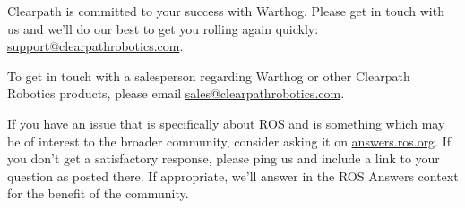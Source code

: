 \documentclass[]{clearpath-latex/clearpath-manual}
\begin{document}
Clearpath is committed to your success with Warthog. Please get in touch with us and we’ll do our best to get
you rolling again quickly: \url{support@clearpathrobotics.com}.

To get in touch with a salesperson regarding Warthog or other Clearpath Robotics products, please email
\url{sales@clearpathrobotics.com}.

If you have an issue that is specifically about ROS and is something which may be of interest to the broader
community, consider asking it on \url{answers.ros.org}. If you don’t get a satisfactory response, please ping us and
include a link to your question as posted there. If appropriate, we’ll answer in the ROS Answers context for
the benefit of the community.

\appendix

\thispagestyle{empty}

\thispagestyle{empty}
\end{document}
